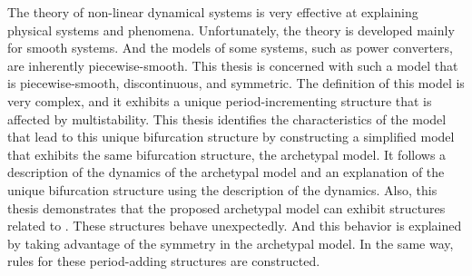 The theory of non-linear dynamical systems is very effective at explaining physical systems and phenomena.
Unfortunately, the theory is developed mainly for smooth systems.
And the models of some systems, such as power converters, are inherently piecewise-smooth.
This thesis is concerned with such a model that is piecewise-smooth, discontinuous, and symmetric.
The definition of this model is very complex, and it exhibits a unique period-incrementing structure that is affected by multistability.
This thesis identifies the characteristics of the model that lead to this unique bifurcation structure by constructing a simplified model that exhibits the same bifurcation structure, the archetypal model.
It follows a description of the dynamics of the archetypal model and an explanation of the unique bifurcation structure using the description of the dynamics.
Also, this thesis demonstrates that the proposed archetypal model can exhibit structures related to .
These structures behave unexpectedly.
And this behavior is explained by taking advantage of the symmetry in the archetypal model.
In the same way, rules for these period-adding structures are constructed.
